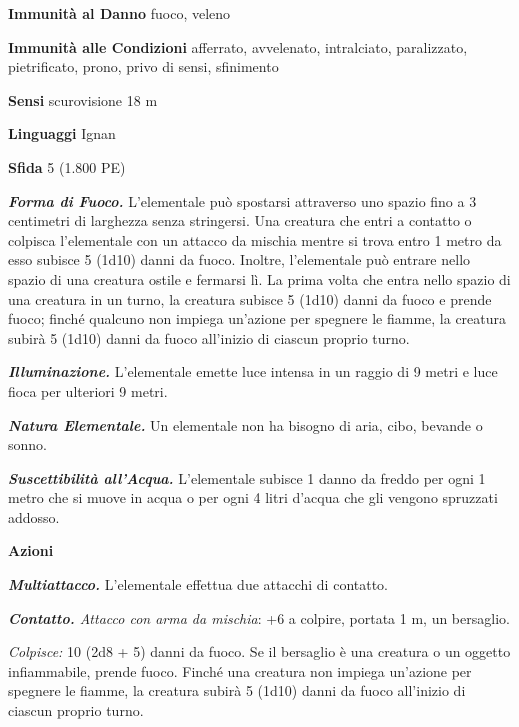 \begin{multicols}{2}
\textbf{Immunità al Danno} fuoco, veleno

\textbf{Immunità alle Condizioni} afferrato, avvelenato, intralciato, paralizzato, pietrificato, prono, privo di sensi, sfinimento

\textbf{Sensi} scurovisione 18 m

\textbf{Linguaggi} Ignan

\textbf{Sfida} 5 (1.800 PE)

\emph{\textbf{Forma di Fuoco.}} L'elementale può spostarsi attraverso uno spazio fino a 3 centimetri di larghezza senza stringersi. Una creatura che entri a contatto o colpisca l'elementale con un attacco da mischia mentre si trova entro 1 metro da esso subisce 5 (1d10) danni da fuoco. Inoltre, l'elementale può entrare nello spazio di una creatura ostile e fermarsi lì. La prima volta che entra nello spazio di una creatura in un turno, la creatura subisce 5 (1d10) danni da fuoco e prende fuoco; finché qualcuno non impiega un'azione per spegnere le fiamme, la creatura subirà 5 (1d10) danni da fuoco all'inizio di ciascun proprio turno.

\emph{\textbf{Illuminazione.}} L'elementale emette luce intensa in un raggio di 9 metri e luce fioca per ulteriori 9 metri.

\emph{\textbf{Natura Elementale.}} Un elementale non ha bisogno di aria, cibo, bevande o sonno.

\emph{\textbf{Suscettibilità all'Acqua.}} L'elementale subisce 1 danno da freddo per ogni 1 metro che si muove in acqua o per ogni 4 litri d'acqua che gli vengono spruzzati addosso.

\textbf{Azioni}

\emph{\textbf{Multiattacco.}} L'elementale effettua due attacchi di contatto.

\emph{\textbf{Contatto.} Attacco con arma da mischia}: +6 a colpire, portata 1 m, un bersaglio.

\emph{Colpisce:} 10 (2d8 + 5) danni da fuoco. Se il bersaglio è una creatura o un oggetto infiammabile, prende fuoco. Finché una creatura non impiega un'azione per spegnere le fiamme, la creatura subirà 5 (1d10) danni da fuoco all'inizio di ciascun proprio turno.


\end{multicols}
